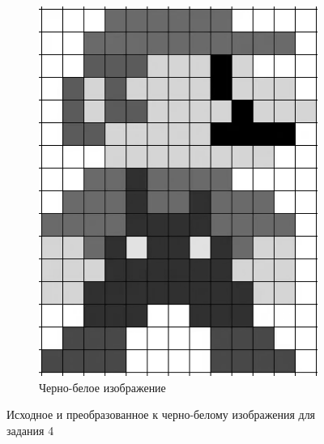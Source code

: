 \documentclass[a4paper, 12pt]{article}
\begin{document}
\begin{figure}[H]
\begin{subfigure}{0.35\textwidth}
            \includegraphics[width=\linewidth]{img2gray.png}
            \caption{Черно-белое изображение}
            \label{fig:padotpnggray}
        \end{subfigure}
        \caption{Исходное и преобразованное к черно-белому изображения для задания 4}
        \label{fig:task4origin}
    \end{figure}
\end{document}

